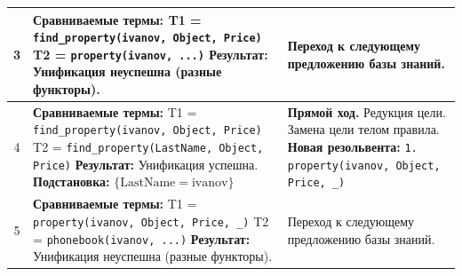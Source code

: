 \begin{tabularx}{\textwidth}{|c|X|X|}
	3                                                                                                   &
	\textbf{Сравниваемые термы:} \newline
	T1 = \texttt{find\_property(ivanov, Object, Price)} \newline
	T2 = \texttt{property(ivanov, ...)} \newline
	\textbf{Результат:} Унификация неуспешна (разные функторы).                                         &
	Переход к следующему предложению базы знаний.                                                                                                                                                                  \\
	\hline

	4                                                                                                   &
	\textbf{Сравниваемые термы:} \newline
	T1 = \texttt{find\_property(ivanov, Object, Price)} \newline
	T2 = \texttt{find\_property(LastName, Object, Price)} \newline
	\textbf{Результат:} Унификация успешна. \newline
	\textbf{Подстановка:} \newline
	$\{\text{LastName}=\text{ivanov}\}$                                                                 &
	\textbf{Прямой ход.} Редукция цели. Замена цели телом правила. \newline
	\textbf{Новая резольвента:} \newline
	\texttt{1. property(ivanov, Object, Price, \_)}                                                                                                                                                                \\
	\hline

	5                                                                                                   &
	\textbf{Сравниваемые термы:} \newline
	T1 = \texttt{property(ivanov, Object, Price, \_)} \newline
	T2 = \texttt{phonebook(ivanov, ...)} \newline
	\textbf{Результат:} Унификация неуспешна (разные функторы).                                         &
	Переход к следующему предложению базы знаний.                                                                                                                                                                  \\
	\hline


\end{tabularx}
